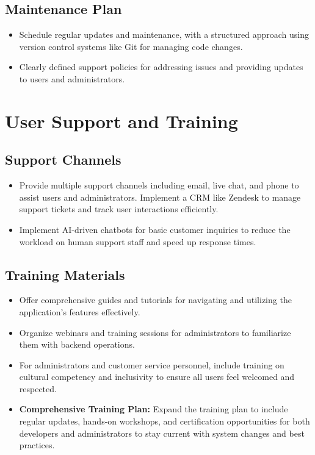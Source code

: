 \documentclass[11pt]{article}
\begin{document}
	\subsection*{Maintenance Plan}
	\begin{itemize}
		\item Schedule regular updates and maintenance, with a structured approach using version control systems like Git for managing code changes.
		\item Clearly defined support policies for addressing issues and providing updates to users and administrators.
	\end{itemize}
	
	\section*{User Support and Training}
	
	\subsection*{Support Channels}
	\begin{itemize}
		\item Provide multiple support channels including email, live chat, and phone to assist users and administrators. Implement a CRM like Zendesk to manage support tickets and track user interactions efficiently.
		\item Implement AI-driven chatbots for basic customer inquiries to reduce the workload on human support staff and speed up response times.
	\end{itemize}
	
	\subsection*{Training Materials}
	\begin{itemize}
		\item Offer comprehensive guides and tutorials for navigating and utilizing the application's features effectively.
		\item Organize webinars and training sessions for administrators to familiarize them with backend operations.
		\item For administrators and customer service personnel, include training on cultural competency and inclusivity to ensure all users feel welcomed and respected.
		\item \textbf{Comprehensive Training Plan:} Expand the training plan to include regular updates, hands-on workshops, and certification opportunities for both developers and administrators to stay current with system changes and best practices.
	\end{itemize}
	
\end{document}
